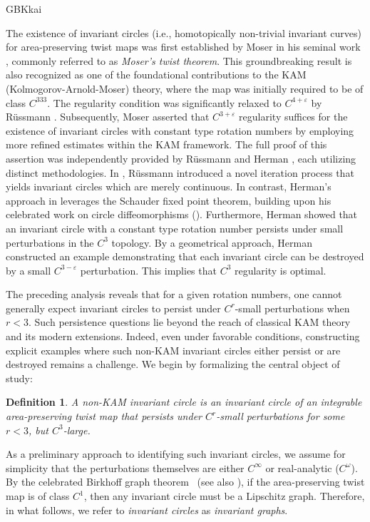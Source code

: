 \documentclass{amsart}
\newcommand{\eps}{\varepsilon}
\newtheorem{Definition}{Definition}[section]
\theoremstyle{definition}
\begin{document}
\begin{CJK*}{GBK}{kai}
		
		The existence of invariant circles (i.e., homotopically non-trivial invariant curves) for area-preserving twist maps was first established by Moser in his seminal work \cite{Mo1}, commonly referred to as \emph{Moser's twist theorem}. This groundbreaking result is also recognized as one of the foundational contributions to the KAM (Kolmogorov-Arnold-Moser) theory, where the map was initially required to be of class \( C^{333} \). The regularity condition was significantly relaxed to \( C^{4+\eps} \) by R\"{u}ssmann \cite{R1}. Subsequently, Moser \cite[Page 53]{Mo2} asserted that \( C^{3+\eps} \) regularity suffices for the existence of invariant circles with constant type rotation numbers by employing more refined estimates within the KAM framework. The full proof of this assertion was independently provided by R\"{u}ssmann \cite{R2} and Herman \cite{H1}, each utilizing distinct methodologies. In \cite{R2}, R\"{u}ssmann introduced a novel iteration process that yields invariant circles which are merely continuous. In contrast, Herman's approach in \cite{H1} leverages the Schauder fixed point theorem, building upon his celebrated work on circle diffeomorphisms (\cite{H11}). Furthermore, Herman \cite{H33}  showed that an invariant circle with a constant type rotation number persists under small perturbations in the $C^{3}$ topology. By a geometrical approach, Herman \cite{H1}   constructed an example demonstrating that each invariant circle can be destroyed by a small $C^{3-\eps}$ perturbation. This implies that $C^{3}$ regularity is optimal.
		
		The preceding analysis reveals that for a given rotation numbers, one cannot generally expect invariant circles to persist under $C^r$-small perturbations when $r < 3$. Such persistence questions lie beyond the reach of classical KAM theory and its modern extensions. Indeed, even under favorable conditions, constructing explicit examples where such non-KAM invariant circles either persist or are destroyed remains a  challenge. We begin by formalizing the central object of study:

\begin{Definition}
A \emph{non-KAM invariant circle} is an invariant circle of an integrable area-preserving twist map that persists under $C^r$-small perturbations for some $r < 3$, but  $C^3$-large.
\end{Definition}

As a preliminary approach to identifying such invariant circles, we assume for simplicity that the perturbations themselves are either $C^\infty$ or real-analytic ($C^\omega$). By the celebrated Birkhoff graph theorem~\cite{B20} (see also \cite[Chapter I]{H1}), if the area-preserving twist map is of class $C^1$, then any invariant circle must be a Lipschitz graph. Therefore, in what follows, we refer to \emph{invariant circles} as \emph{invariant graphs}.


\end{CJK*}
\end{document}
